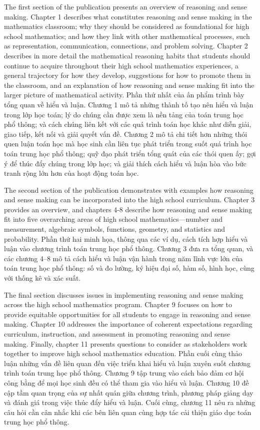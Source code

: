 \documentclass[
  10pt,
  a4paper,
  landscape,
  twoside,
  openany
]{scrbook}
\newcommand{\EN}[1]{#1}
\newcommand{\VI}[1]{#1}
\newcommand{\NOTE}[1]{#1}
\newcounter{example}
\begin{document}
\TriPara
{
\EN{The first section of the publication presents an overview of reasoning and sense making. Chapter 1 describes what constitutes reasoning and sense making in the mathematics classroom; why they should be considered as foundational for high school mathematics; and how they link with other mathematical processes, such as representation, communication, connections, and problem solving. Chapter 2 describes in more detail the mathematical reasoning habits that students should continue to acquire throughout their high school mathematics experiences, a general trajectory for how they develop, suggestions for how to promote them in the classroom, and an explanation of how reasoning and sense making fit into the larger picture of mathematical activity.}
}
{
\VI{Phần thứ nhất của ấn phẩm trình bày tổng quan về hiểu và luận. Chương 1 mô tả những thành tố tạo nên hiểu và luận trong lớp học toán; lý do chúng cần được xem là nền tảng của toán trung học phổ thông; và cách chúng liên kết với các quá trình toán học khác như diễn giải, giao tiếp, kết nối và giải quyết vấn đề. Chương 2 mô tả chi tiết hơn những thói quen luận toán học mà học sinh cần liên tục phát triển trong suốt quá trình học toán trung học phổ thông; quỹ đạo phát triển tổng quát của các thói quen ấy; gợi ý để thúc đẩy chúng trong lớp học; và giải thích cách hiểu và luận hòa vào bức tranh rộng lớn hơn của hoạt động toán học.}
}
{
\NOTE{}
}

\TriPara
{
\EN{The second section of the publication demonstrates with examples how reasoning and sense making can be incorporated into the high school curriculum. Chapter 3 provides an overview, and chapters 4-8 describe how reasoning and sense making fit into five overarching areas of high school mathematics---number and measurement, algebraic symbols, functions, geometry, and statistics and probability.}
}
{
\VI{Phần thứ hai minh họa, thông qua các ví dụ, cách tích hợp hiểu và luận vào chương trình toán trung học phổ thông. Chương 3 đưa ra tổng quan, và các chương 4--8 mô tả cách hiểu và luận vận hành trong năm lĩnh vực lớn của toán trung học phổ thông: số và đo lường, ký hiệu đại số, hàm số, hình học, cùng với thống kê và xác suất.}
}
{
\NOTE{}
}

\TriPara
{
\EN{The final section discusses issues in implementing reasoning and sense making across the high school mathematics program. Chapter 9 focuses on how to provide equitable opportunities for all students to engage in reasoning and sense making. Chapter 10 addresses the importance of coherent expectations regarding curriculum, instruction, and assessment in promoting reasoning and sense making. Finally, chapter 11 presents questions to consider as stakeholders work together to improve high school mathematics education.}
}
{
\VI{Phần cuối cùng thảo luận những vấn đề liên quan đến việc triển khai hiểu và luận xuyên suốt chương trình toán trung học phổ thông. Chương 9 tập trung vào cách bảo đảm cơ hội công bằng để mọi học sinh đều có thể tham gia vào hiểu và luận. Chương 10 đề cập tầm quan trọng của sự nhất quán giữa chương trình, phương pháp giảng dạy và đánh giá trong việc thúc đẩy hiểu và luận. Cuối cùng, chương 11 nêu ra những câu hỏi cần cân nhắc khi các bên liên quan cùng hợp tác cải thiện giáo dục toán trung học phổ thông.}
}
{
\NOTE{}
}
\end{document}
